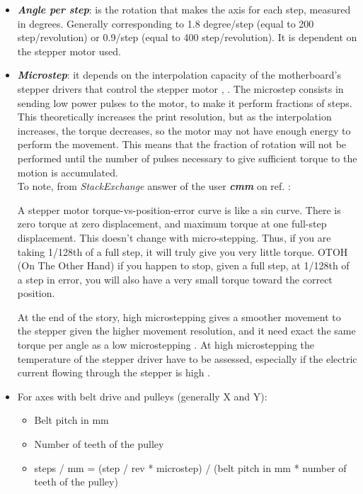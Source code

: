 \begin{itemize}
\item \emph{\textbf{Angle per step}}: is the rotation that makes the axis for each step, measured in degrees. Generally corresponding to 1.8 degree/step (equal to 200 step/revolution) or 0.9/step (equal to 400 step/revolution). It is dependent on the stepper motor used.
\item \emph{\textbf{Microstep}}: it depends on the interpolation capacity of the motherboard's stepper drivers that control the stepper motor \parencite{Reference5}, \parencite{Reference6}. The microstep consists in sending low power pulses to the motor, to make it perform fractions of steps. This theoretically increases the print resolution, but as the interpolation increases, the torque decreases, so the motor may not have enough energy to perform the movement. This means that the fraction of rotation will not be performed until the number of pulses necessary to give sufficient torque to the motion is accumulated.\\ To note, from \emph{StackExchange} answer of the user \emph{\textbf{cmm}} \parencite{Reference149} on ref. \parencite{Reference6}:

\begin{displayquote}
A stepper motor torque-vs-position-error curve is like a sin curve.  There is zero torque at zero displacement, and maximum torque at one full-step displacement. This doesn't change with micro-stepping. Thus, if you are taking 1/128th of a full step, it will truly give you very little torque.  OTOH (On The Other Hand) if you happen to stop, given a full step, at 1/128th of a step in error, you will also have a very small torque toward the correct position.
\end{displayquote}

At the end of the story, high microstepping gives a smoother movement to the stepper given the higher movement resolution, and it need exact the same torque per angle as a low microstepping \parencite{Reference150}. At high microstepping the temperature of the stepper driver have to be assessed, especially if the electric current flowing through the stepper is high \parencite{Reference151}.

\item For axes with belt drive and pulleys (generally X and Y):

\begin{itemize}
\item Belt pitch in mm
\item Number of teeth of the pulley
\item steps / mm = (step / rev * microstep) / (belt pitch in mm * number of teeth of the pulley)
\end{itemize}


\end{itemize}
